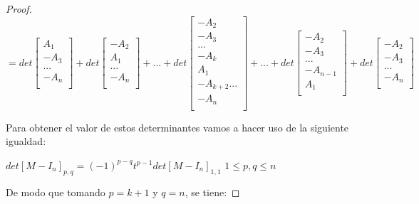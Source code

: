 \begin{lem}
\begin{proof}
	           \[=det\begin{bmatrix}
	           A_{1}  \\
	           - A_{3} \\
	           ... \\	
	           - A_{n} \\
	           \end{bmatrix}+det\begin{bmatrix}
	           -A_{2}  \\
	           A_{1} \\
	           ... \\	
	           - A_{n} \\
	           \end{bmatrix}+...+det\begin{bmatrix}
	           -A_{2}  \\
	           -A_{3} \\
	           ... \\
	           -A_{k}\\
	           A_{1}\\
	           -A_{k+2}
	           ...\\	
	           - A_{n} \\
	           \end{bmatrix}+...+det\begin{bmatrix}
	           -A_{2}  \\
	           - A_{3} \\
	           ... \\	
	           - A_{n-1} \\
	           A_{1}\\
	           \end{bmatrix}+det\begin{bmatrix}
	           - A_{2}  \\
	           - A_{3} \\
	           ... \\	
	           - A_{n} \\
	           \end{bmatrix}\]
	           
	           Para obtener el valor de estos determinantes vamos a hacer uso de la siguiente igualdad:
	           \begin{center}
	           	$ det[M-I_{n}]_{p,q} = (-1)^{p-q}t^{p-1}det[M-I_{n}]_{1,1}	 $ $1\le p,q \le n$  
	           \end{center}    
	           
	           De modo que tomando $ p=k+1 $ y $ q=n $, se tiene:     
	           

\end{proof}
\end{lem}

